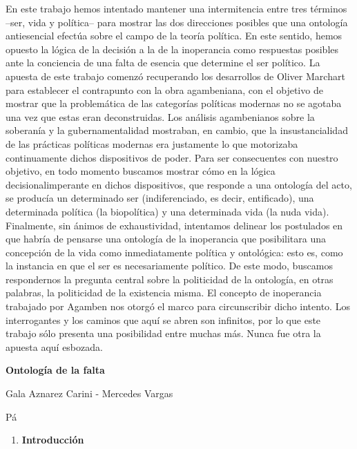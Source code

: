 En este trabajo hemos intentado mantener una intermitencia entre tres términos --ser, vida y política-- para mostrar las dos direcciones posibles que una ontología antiesencial efectúa sobre el campo de la teoría política. En este sentido, hemos opuesto la lógica de la decisión a la de la inoperancia como respuestas posibles ante la conciencia de una falta de esencia que determine el ser político. La apuesta de este trabajo comenzó recuperando los desarrollos de Oliver Marchart para establecer el contrapunto con la obra agambeniana, con el objetivo de mostrar que la problemática de las categorías políticas modernas no se agotaba una vez que estas eran deconstruidas. Los análisis agambenianos sobre la soberanía y la gubernamentalidad mostraban, en cambio, que la insustancialidad de las prácticas políticas modernas era justamente lo que motorizaba continuamente dichos dispositivos de poder. Para ser consecuentes con nuestro objetivo, en todo momento buscamos mostrar cómo en la lógica decisionalimperante en dichos dispositivos, que responde a una ontología del acto, se producía un determinado ser (indiferenciado, es decir, entificado), una determinada política (la biopolítica) y una determinada vida (la nuda vida). Finalmente, sin ánimos de exhaustividad, intentamos delinear los postulados en que habría de pensarse una ontología de la inoperancia que posibilitara una concepción de la vida como inmediatamente política y ontológica: esto es, como la instancia en que el ser es necesariamente político. De este modo, buscamos respondernos la pregunta central sobre la politicidad de la ontología, en otras palabras, la politicidad de la existencia misma. El concepto de inoperancia trabajado por Agamben nos otorgó el marco para circunscribir dicho intento. Los interrogantes y los caminos que aquí se abren son infinitos, por lo que este trabajo sólo presenta una posibilidad entre muchas más. Nunca fue otra la apuesta aquí esbozada.

\textbf{Ontología de la falta}

Gala Aznarez Carini - Mercedes Vargas

Pá

\begin{enumerate}
\def\labelenumi{\arabic{enumi}.}
\item
  \textbf{Introducción}
\end{enumerate}

